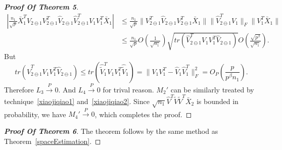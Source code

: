 \begin{proof}[\textbf{Proof Of Theorem 5}]
\begin{equation}
\begin{aligned}
|\frac{n_1}{\sqrt{p}}\bar{X}_1^T V_{2\ominus 1}V_{2\ominus 1}^T \hat{V}_{2\ominus 1}\hat{V}_{2\ominus 1}^T V_1 V_1^T \bar{X}_1|
&\leq \frac{n_1}{\sqrt{p}}\|V^T_{2\ominus 1}\hat{V}_{2\ominus 1}V_{2\ominus 1}^T\bar{X}_1\|\|\hat{V}_{2\ominus 1}^T V_1\|_F \|{V}_1^T\bar{X}_1\|\\
&\leq
\frac{n_1}{\sqrt{p}}O(\frac{1}{\sqrt{n_1}})\sqrt{tr(\hat{V}_{2\ominus 1}^T V_{1}V_{1}^T\hat{V}_{2\ominus 1})}O(\frac{\sqrt{p^{\beta}}}{\sqrt{n_1}}).
\end{aligned}
\end{equation}
But
\begin{equation*}
tr(\hat{V}_{2\ominus 1}^T V_{1}V_{1}^T\hat{V}_{2\ominus 1})\leq tr(\hat{\tilde{V}}_1^T {V}_1{V}_1^T\hat{\tilde{V}}_1)=\|V_1V_1^T- \hat{V}_1\hat{V}_1^T\|_F^2=O_P(\frac{p}{p^{\beta}n_1}).
\end{equation*}
Therefore $L_3\xrightarrow{P}0$. And $L_4\xrightarrow{P}0$ for trival reason.
 $M_2'$ can be similarly treated by technique~\eqref{xiaojiqiao1} and~\eqref{xiaojiqiao2}. Since $\sqrt{n_1}\hat{V}^T\tilde{V}\tilde{V}^T\bar{X}_2$ is bounded in probability, we have $M_4'\xrightarrow{P} 0$, which completes the proof.

    \end{proof}
\begin{proof}[\textbf{Proof Of Theorem 6}]
    The theorem follows by the same method as Theorem~\ref{spaceEstimation}.
\end{proof}

